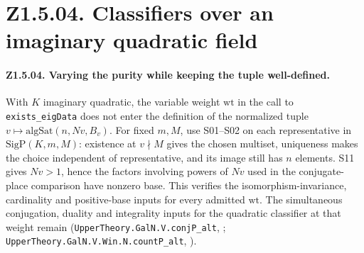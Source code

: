 \section*{Z1.5.04. Classifiers over an imaginary quadratic field}

\paragraph{Z1.5.04. Varying the purity while keeping the tuple well-defined.}
\label{r8:small:Z1.5.04}
With \(K\) imaginary quadratic, the variable weight \(\mathrm{wt}\) in
the call to \nolinkurl{exists_eigData} does not enter the definition of
the normalized tuple \(v\mapsto\mathrm{algSat}(n,Nv,B_v)\). For fixed
\(m,M\), use S01--S02 on each representative in \(\mathrm{SigP}(K,m,M)\):
existence at \(v\nmid M\) gives the chosen multiset, uniqueness makes the
choice independent of representative, and its image still has \(n\) elements.
S11 gives \(Nv>1\), hence the factors involving powers of \(Nv\) used in
the conjugate-place comparison have nonzero base. This verifies the
isomorphism-invariance, cardinality and positive-base inputs for every
admitted \(\mathrm{wt}\). The simultaneous conjugation, duality and
integrality inputs for the quadratic classifier at that weight remain
(\nolinkurl{UpperTheory.GalN.V.conjP_alt}, ;
\nolinkurl{UpperTheory.GalN.V.Win.N.countP_alt},
).


